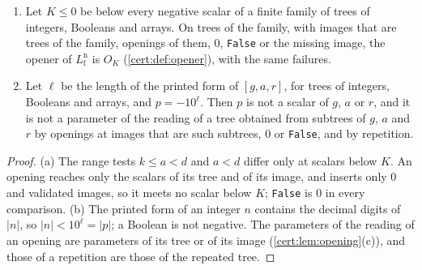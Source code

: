 \begin{lemma}\label{cert:lem:printed}
\begin{enumerate}[label=(\alph*)]
\item Let $K\le 0$ be below every negative scalar of a finite family of trees of integers, Booleans
and arrays. On trees of the family, with images that are trees of the family, openings of them, $0$,
\texttt{False} or the missing image, the opener of $L^{\mathrm n}_{\mathrm f}$ is $O_K$
(\cref{cert:def:opener}), with the same failures.
\item Let $\ell$ be the length of the printed form of $[g,a,r]$, for trees of integers, Booleans and
arrays, and $p=-10^{\ell}$. Then $p$ is not a scalar of $g$, $a$ or $r$, and it is not a parameter of
the reading of a tree obtained from subtrees of $g$, $a$ and $r$ by openings at images that are such
subtrees, $0$ or \texttt{False}, and by repetition.
\end{enumerate}
\end{lemma}
\begin{proof}
(a) The range tests $k\le a<d$ and $a<d$ differ only at scalars below $K$. An opening reaches only the
scalars of its tree and of its image, and inserts only $0$ and validated images, so it meets no scalar
below $K$; \texttt{False} is $0$ in every comparison. (b) The printed form of an integer $n$ contains
the decimal digits of $\lvert n\rvert$, so $\lvert n\rvert<10^{\ell}=\lvert p\rvert$; a Boolean is
not negative. The parameters of the reading of an opening are parameters of its tree or of its image
(\cref{cert:lem:opening}(c)), and those of a repetition are those of the repeated tree.
\end{proof}


